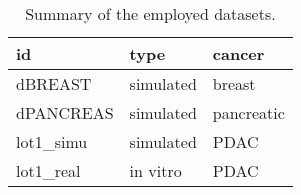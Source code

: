 \begin{table}[ht]
\centering
\caption{Summary of the employed datasets.}
\label{tab:datasets}
\begin{tabular}{l|l|l}
id & type & cancer \\ \hline
dBREAST & simulated & breast \\
dPANCREAS & simulated & pancreatic \\
lot1\_simu & simulated & PDAC \\
lot1\_real & in vitro & PDAC
\end{tabular}
\end{table}